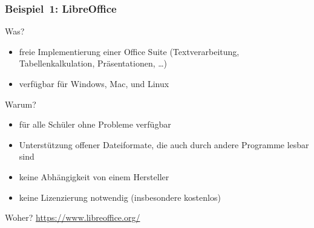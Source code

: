\documentclass{beamer}
\begin{document}
\begin{frame}
  \frametitle{Beispiel~1: LibreOffice}

  \onslide<+->
  \begin{block}{Was?}
    \begin{itemize}
    \item freie Implementierung einer Office Suite (Textverarbeitung,
      Tabellenkalkulation, Präsentationen, \dots)
    \item verfügbar für Windows, Mac, und Linux
    \end{itemize}
  \end{block}

  \onslide<+->
  \begin{block}{Warum?}
    \begin{itemize}
    \item für alle Schüler ohne Probleme verfügbar
    \item Unterstützung offener Dateiformate, die auch durch andere Programme
      lesbar sind
    \item keine Abhängigkeit von einem Hersteller
    \item keine Lizenzierung notwendig (insbesondere kostenlos)
    \end{itemize}
  \end{block}

  \onslide<+->

  \begin{block}{Woher?}
    \url{https://www.libreoffice.org/}
  \end{block}


\end{frame}
\end{document}
